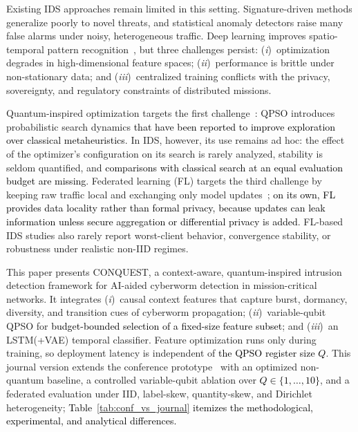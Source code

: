 \documentclass[conference]{IEEEtran}
\begin{document}
Existing IDS approaches remain limited in this setting.
Signature-driven methods generalize poorly to novel threats, and
statistical anomaly detectors raise many false alarms under noisy,
heterogeneous traffic. Deep learning improves spatio-temporal pattern
recognition~\cite{al202}, but three challenges persist:
(\textit{i})~optimization degrades in high-dimensional feature spaces;
(\textit{ii})~performance is brittle under non-stationary data; and
(\textit{iii})~centralized training conflicts with the privacy,
sovereignty, and regulatory constraints of distributed missions.

Quantum-inspired optimization targets the first
challenge~\cite{ajakwe2025eqai,vivekquantum}: QPSO introduces
probabilistic search dynamics \textcolor{black}{that have been reported
to improve exploration over classical metaheuristics}. In IDS,
however, its use remains ad hoc: the effect of the optimizer's
configuration on its search is rarely analyzed, stability is seldom quantified, and
\textcolor{black}{comparisons with classical search at an equal
evaluation budget are missing}. Federated learning (FL) targets the
third challenge by keeping raw traffic local and exchanging only
model updates~\cite{hamadsystematic}; \textcolor{black}{on its
own, FL provides data locality rather than formal privacy, because
updates can leak information unless secure aggregation or
differential privacy is added}. FL-based IDS studies also rarely
report worst-client behavior, convergence stability, or robustness
under realistic non-IID regimes.

This paper presents CONQUEST, a context-aware, quantum-inspired
intrusion detection framework for AI-aided cyberworm detection in
mission-critical networks. It integrates (\textit{i})~causal context
features that capture burst, dormancy, diversity, and transition cues
of cyberworm propagation; (\textit{ii})~variable-qubit QPSO for
\textcolor{black}{budget-bounded selection of a fixed-size
feature subset}; and (\textit{iii})~an LSTM(+VAE) temporal
classifier. Feature optimization runs only during training, so
deployment latency is independent of \textcolor{black}{the
QPSO register size $Q$}. This journal version extends the conference
prototype~\cite{ajakweconquest} with an optimized non-quantum
baseline, a controlled variable-qubit ablation over
\textcolor{black}{$Q\in\{1,\dots,10\}$}, and a federated evaluation
under IID, label-skew, quantity-skew, and Dirichlet heterogeneity;
\textcolor{black}{Table~\ref{tab:conf_vs_journal} itemizes the
methodological, experimental, and analytical differences.}
\end{document}
